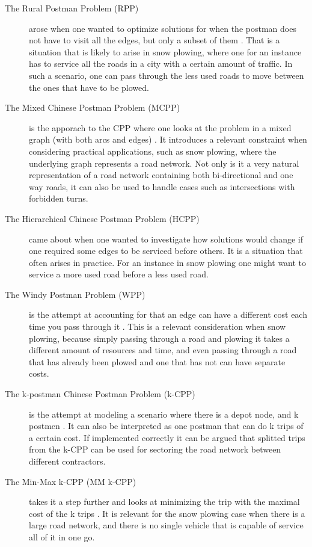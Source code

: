 \begin{description}

\item [The Rural Postman Problem (RPP)] arose when one wanted to optimize solutions for when the postman does not have to visit all the edges, but only a subset of them \citep{pearn1995RPP}. That is a situation that is likely to arise in snow plowing, where one for an instance has to service all the roads in a city with a certain amount of traffic. In such a scenario, one can pass through the less used roads to move between the ones that have to be plowed.



\item [The Mixed Chinese Postman Problem (MCPP)] is the apporach to the CPP where one looks at the problem in a mixed graph (with both arcs and edges) \citep{pearn1995mixedCPP}. It introduces a relevant constraint when considering practical applications, such as snow plowing, where the underlying graph represents a road network. Not only is it a very natural representation of a road network containing both bi-directional and one way roads, it can also be used to handle cases such as intersections with forbidden turns.

\item [The Hierarchical Chinese Postman Problem (HCPP)] \citep{ghiani2000HCPP} came about when one wanted to investigate how solutions would change if one required some edges to be serviced before others. It is a situation that often arises in practice. For an instance in snow plowing one might want to service a more used road before a less used road.

\item [The Windy Postman Problem (WPP)] is the attempt at accounting for that an edge can have a different cost each time you pass through it \citep{dussault2013WPP}. This is a relevant consideration when snow plowing, because simply passing through a road and plowing it takes a different amount of resources and time, and even passing through a road that has already been plowed and one that has not can have separate costs.

\item [The k-postman Chinese Postman Problem (k-CPP)] is the attempt at modeling a scenario where there is a depot node, and k postmen \citep{edmonds1973kCPP}. It can also be interpreted as one postman that can do k trips of a certain cost. If implemented correctly it can be argued that splitted trips from the k-CPP can be used for sectoring the road network between different contractors.

\item[The Min-Max k-CPP (MM k-CPP)] takes it a step further and looks at minimizing the trip with the maximal cost of the k trips \citep{frederickson1976MMkCPP}. It is relevant for the snow plowing case when there is a large road network, and there is no single vehicle that is capable of service all of it in one go. 

\end{description}

